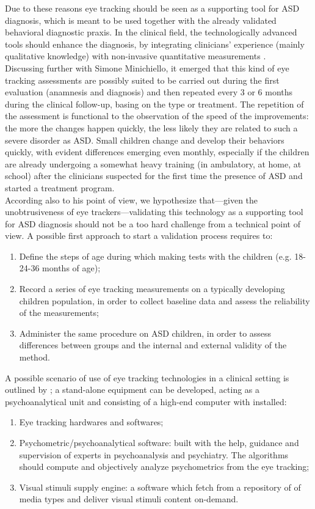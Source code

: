 Due to these reasons eye tracking should be seen as a supporting tool for ASD diagnosis, which is meant to be used together with the already validated behavioral diagnostic praxis. In the clinical field, the technologically advanced tools should enhance the diagnosis, by integrating clinicians’ experience (mainly qualitative knowledge) with non-invasive quantitative measurements \citep{orlandi2014advancedtools}.\\
Discussing further with Simone Minichiello, it emerged that this kind of eye tracking assessments are possibly suited to be carried out during the first evaluation (anamnesis and diagnosis) and then repeated every 3 or 6 months during the clinical follow-up, basing on the type or treatment. The repetition of the assessment is functional to the observation of the speed of the improvements: the more the changes happen quickly, the less likely they are related to such a severe disorder as ASD. Small children change and develop their behaviors quickly, with evident differences emerging even monthly, especially if the children are already undergoing a somewhat heavy training (in ambulatory, at home, at school) after the clinicians suspected for the first time the presence of ASD and started a treatment program.\\
According also to his point of view, we hypothesize that—given the unobtrusiveness of eye trackers—validating this technology as a supporting tool for ASD diagnosis should not be a too hard challenge from a technical point of view. A possible first approach to start a validation process requires to:
\begin{enumerate}
    \item Define the steps of age during which making tests with the children (e.g. 18-24-36 months of age);
    \item Record a series of eye tracking measurements on a typically developing children population, in order to collect baseline data and assess the reliability of the measurements;
    \item Administer the same procedure on ASD children, in order to assess differences between groups and the internal and external validity of the method.
\end{enumerate}
A possible scenario of use of eye tracking technologies in a clinical setting is outlined by \cite{subrahmaniam2013animation}; a stand-alone equipment can be developed, acting as a psychoanalytical unit and consisting of a high-end computer with installed:
\begin{enumerate}
    \item Eye tracking hardwares and softwares;
    \item Psychometric/psychoanalytical software: built with the help, guidance and supervision of experts in psychoanalysis and psychiatry. The algorithms should compute and objectively analyze psychometrics from the eye tracking;
    \item Visual stimuli supply engine: a software which fetch from a repository of of media types and deliver visual stimuli content on-demand.
\end{enumerate}
